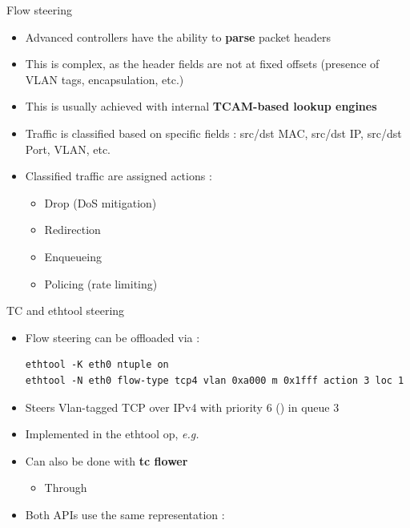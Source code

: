 \begin{frame}{Flow steering}
	\begin{itemize}
		\item Advanced controllers have the ability to \textbf{parse} packet headers
		\item This is complex, as the header fields are not at fixed offsets (presence of VLAN tags, encapsulation, etc.)
		\item This is usually achieved with internal \textbf{TCAM-based lookup engines}
		\item Traffic is classified based on specific fields : src/dst MAC, src/dst IP, src/dst Port, VLAN, etc.
		\item Classified traffic are assigned actions :
			\begin{itemize}
				\item Drop (DoS mitigation)
				\item Redirection
				\item Enqueueing
				\item Policing (rate limiting)
			\end{itemize}
	\end{itemize}
\end{frame}

\begin{frame}[fragile]{TC and ethtool steering}
	\begin{itemize}
		\item Flow steering can be offloaded via  :
			\begin{verbatim}
ethtool -K eth0 ntuple on
ethtool -N eth0 flow-type tcp4 vlan 0xa000 m 0x1fff action 3 loc 1
			\end{verbatim}
		\item Steers Vlan-tagged TCP over IPv4 with priority 6 () in queue 3
		\item Implemented in the  ethtool op, \textit{e.g.} 
		\item Can also be done with \textbf{tc flower}
			\begin{itemize}
				\item Through 
			\end{itemize}
		\item Both APIs use the same representation : 
	\end{itemize}
\end{frame}

